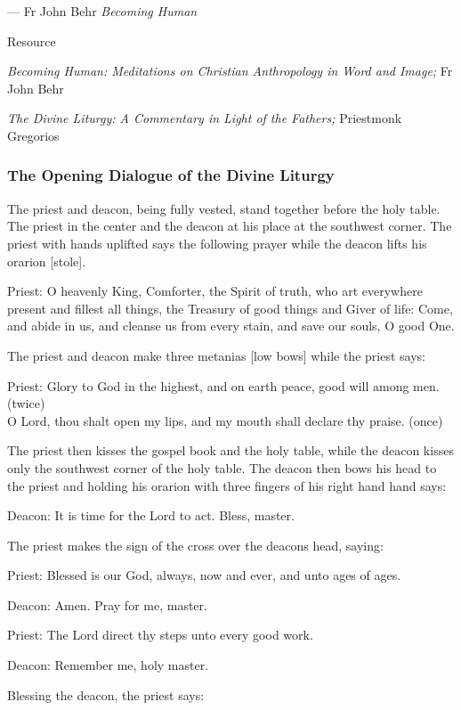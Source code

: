 \documentclass[
]{article}
\begin{document}
--- Fr John Behr \emph{Becoming Human}

Resource

\emph{Becoming Human: Meditations on Christian Anthropology in Word and
Image;} Fr John Behr

\emph{The Divine Liturgy: A Commentary in Light of the Fathers;}
Priestmonk Gregorios

\subsubsection{The Opening Dialogue of the Divine
Liturgy}\label{the-opening-dialogue-of-the-divine-liturgy}

The priest and deacon, being fully vested, stand together before the
holy table. The priest in the center and the deacon at his place at the
southwest corner. The priest with hands uplifted says the following
prayer while the deacon lifts his orarion {[}stole{]}.

Priest: O heavenly King, Comforter, the Spirit of truth, who art
everywhere present and fillest all things, the Treasury of good things
and Giver of life: Come, and abide in us, and cleanse us from every
stain, and save our souls, O good One.

The priest and deacon make three metanias {[}low bows{]} while the
priest says:

Priest: Glory to God in the highest, and on earth peace, good will among
men. (twice)\\
O Lord, thou shalt open my lips, and my mouth shall declare thy praise.
(once)

The priest then kisses the gospel book and the holy table, while the
deacon kisses only the southwest corner of the holy table. The deacon
then bows his head to the priest and holding his orarion with three
fingers of his right hand hand says:

Deacon: It is time for the Lord to act. Bless, master.

The priest makes the sign of the cross over the deacon\textquotesingle s
head, saying:

Priest: Blessed is our God, always, now and ever, and unto ages of ages.

Deacon: Amen. Pray for me, master.

Priest: The Lord direct thy steps unto every good work.

Deacon: Remember me, holy master.

Blessing the deacon, the priest says:
\end{document}
